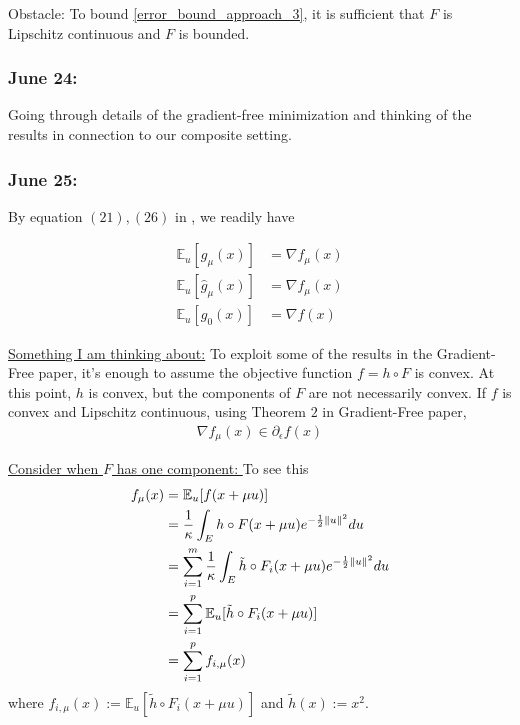 \documentclass{article}
\begin{document}
Obstacle: To bound \eqref{error_bound_approach_3}, it is sufficient that $F$ is Lipschitz continuous and $F$ is bounded. 

\subsubsection{June 24:} Going through details of the gradient-free minimization and thinking of the results in connection to our composite setting. \newline 

\subsubsection{June 25:}

By equation $(21),(26)$ in \cite{Nesterov2015}, we readily have 

\begin{align}
\mathbb{E}_u[g_{\mu}(x)] & = \nabla f_{\mu}(x) \\ \mathbb{E}_u[\hat{g}_{\mu}(x)] & = \nabla f_{\mu}(x) \\ \mathbb{E}_u[g_0(x)] & = \nabla f(x) 
\end{align}

\underline{Something I am thinking about:} To exploit some of the results in the Gradient-Free paper, it's enough to assume the objective function $f = h \circ F$ is convex. At this point, $h$ is convex, but the components of $F$ are not necessarily convex. If $f$ is convex and Lipschitz continuous, using Theorem $2$ in Gradient-Free paper, 
\begin{align}
\nabla f_{\mu}(x) \in \partial_{\epsilon}f(x)
\end{align}

\underline{Consider when $F$ has one component: } To see this 
\begin{align}
f_{\mu}(x) & = \mathbb{E}_u[f(x+\mu u)] \notag  \\ & = \frac{1}{\kappa}\int_E h \circ F(x+\mu u)e^{-\frac{1}{2}\|u\|^2}du \notag \\ & = \sum_{i=1}^m \frac{1}{\kappa} \int_E \tilde{h} \circ F_i(x + \mu u) e^{-\frac{1}{2}\|u\|^2}du \notag \\ & = \sum_{i=1}^p \mathbb{E}_u[\tilde{h} \circ F_i(x+ \mu u)] \notag \\ & = \sum_{i=1}^p f_{i,\mu}(x) 
\end{align}
where $f_{i,\mu}(x):= \mathbb{E}_u[\tilde{h} \circ F_i(x+ \mu u)]$ and $\tilde{h}(x):= x^2$.  \newline 
\end{document}
